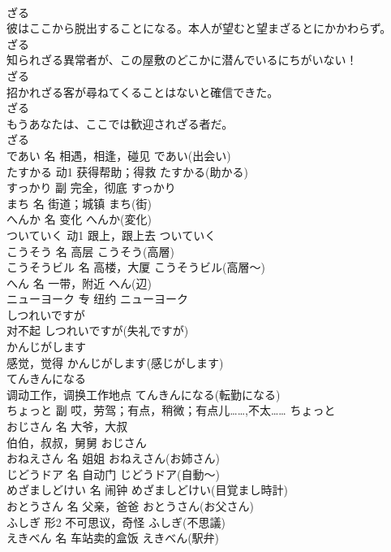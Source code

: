 \documentclass[8pt]{extreport}
\begin{document}
\begin{CJK}{UTF8}{min}
\\	ざる
\\	彼はここから脱出することになる。本人が望むと望まざるとにかかわらず。	
\\	ざる
\\	知られざる異常者が、この屋敷のどこかに潜んでいるにちがいない！	
\\	ざる
\\	招かれざる客が尋ねてくることはないと確信できた。	
\\	ざる
\\	もうあなたは、ここでは歓迎されざる者だ。	
\\	ざる
\\	であい	名	相遇，相逢，碰见	であい(出会い)	
\\	たすかる	动1	获得帮助；得救	たすかる(助かる)	
\\	すっかり	副	完全，彻底	すっかり	
\\	まち	名	街道；城镇	まち(街)	
\\	へんか	名	变化	へんか(変化)	
\\	ついていく	动1	跟上，跟上去	ついていく	
\\	こうそう	名	高层	こうそう(高層)	
\\	こうそうビル	名	高楼，大厦	こうそうビル(高層～)	
\\	へん	名	一带，附近	へん(辺)	
\\	ニューヨーク	专	纽约	ニューヨーク	
\\	しつれいですが	
\\	对不起	しつれいですが(失礼ですが)	
\\	かんじがします	
\\	感觉，觉得	かんじがします(感じがします)	
\\	てんきんになる	
\\	调动工作，调换工作地点	てんきんになる(転勤になる)	
\\	ちょっと	副	哎，劳驾；有点，稍微；有点儿……,不太……	ちょっと	
\\	おじさん	名	大爷，大叔 
\\	伯伯，叔叔，舅舅	おじさん	
\\	おねえさん	名	姐姐	おねえさん(お姉さん)	
\\	じどうドア	名	自动门	じどうドア(自動～)	
\\	めざましどけい	名	闹钟	めざましどけい(目覚まし時計)	
\\	おとうさん	名	父亲，爸爸	おとうさん(お父さん)	
\\	ふしぎ	形2	不可思议，奇怪	ふしぎ(不思議)	
\\	えきべん	名	车站卖的盒饭	えきべん(駅弁)	

\end{CJK}
\end{document}
